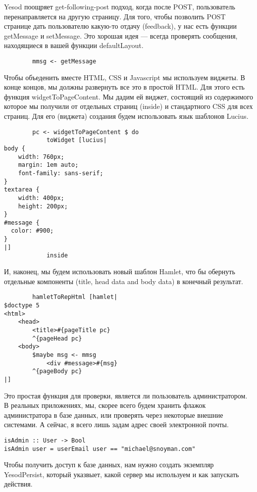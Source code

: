 Yesod поощряет get-following-post подход, когда после POST, пользователь перенаправляется на другую страницу. Для того, чтобы позволить POST странице дать пользователю какую-то отдачу (feedback), у нас есть функции getMessage и setMessage. Это хорошая идея --- всегда проверять сообщения, находящиеся в вашей функции defaultLayout. 
 
\begin{lstlisting}
        mmsg <- getMessage
\end{lstlisting}
 
Чтобы объеденить вместе HTML, CSS и Javascript мы используем виджеты. В конце концов, мы должны развернуть все это в простой HTML. Для этого есть функция widgetToPageContent. Мы дадим ей виджет, состоящий из содержимого которое мы получили от отдельных страниц (inside) и стандартного CSS для всех страниц. Для его (виджета) создания будем использовать язык шаблонов Lucius. 
 
\begin{lstlisting}
        pc <- widgetToPageContent $ do
            toWidget [lucius|
body {
    width: 760px;
    margin: 1em auto;
    font-family: sans-serif;
}
textarea {
    width: 400px;
    height: 200px;
}
#message {
  color: #900;
}
|]
            inside
\end{lstlisting}
 
И, наконец, мы будем использовать новый шаблон Hamlet, что бы обернуть отдельные компоненты (title, head data and body data) в конечный результат. 
 
\begin{lstlisting}
        hamletToRepHtml [hamlet|
$doctype 5
<html>
    <head>
        <title>#{pageTitle pc}
        ^{pageHead pc}
    <body>
        $maybe msg <- mmsg
            <div #message>#{msg}
        ^{pageBody pc}
|]
\end{lstlisting}
 
Это простая функция для проверки, является ли пользователь администратором. В реальных приложениях, мы, скорее всего будем хранить флажок администратора в базе данных, или проверять через некоторые внешние системами. А сейчас, я всего лишь задам адрес своей электронной почты. 
 
\begin{lstlisting}
isAdmin :: User -> Bool
isAdmin user = userEmail user == "michael@snoyman.com"
\end{lstlisting}
 
Чтобы получить доступ к базе данных, нам нужно создать экземпляр YesodPersist, который указвыет, какой сервер мы используем и как запускать действия. 
 
